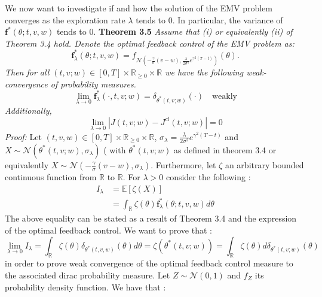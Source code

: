 \documentclass[oneside, a4paper, onecolumn, 11pt]{article}
\begin{document}
We now want to investigate if and how the solution of the EMV problem converges as the exploration rate $\lambda$ tends to 0. In particular, the variance of \(\boldsymbol{f}^*(\theta;t,v,w)\) tends to 0. 
\newline
\textbf{Theorem 3.5} \cite{WangZhou2020} \textit{Assume that (i) or equivalently (ii) of Theorem 3.4 hold. 
Denote the optimal feedback control of the EMV problem as: 
 \[
    \boldsymbol{f}_\lambda^*(\theta;t,v,w) = f_{\mathcal{N}\left( - \frac{\gamma}{\sigma}(v-w), \frac{\lambda}{2\sigma^2} e^{\gamma^2(T-t)} \right)}(\theta).
    \]
Then for all $(t,v;w) \in [0,T] \times \mathbb{R}_{\geq 0} \times \mathbb{R}$ we have the following weak-convergence of probability measures. 
\begin{equation*}
    \lim_{\lambda\to 0} \boldsymbol{f}_\lambda^*(\cdot, t,v;w) = \delta_{\theta^*(t,v;w)}(\cdot)  \quad \text{weakly}
\end{equation*}
Additionally, 
\begin{equation*}
    \lim_{\lambda\to 0}\left| J(t,v;w) - J^{cl}(t,v;w)\right| = 0
\end{equation*} 
}
\textit{Proof:}
Let $(t,v,w) \in [0,T] \times \mathbb{R}_{\geq 0} \times \mathbb{R}$, $\sigma_\lambda = \frac{\lambda}{2\sigma^2} e^{\gamma^2(T-t)}$ and $X \sim \mathcal{N}(\theta^*(t,v;w), \sigma_\lambda)$ ( with $\theta^*(t,v;w)$ as defined in theorem 3.4 or equivalently $X\sim \mathcal{N}(-\frac{\gamma}{\sigma}(v-w), \sigma_\lambda)$. 
Furthermore, let $\zeta$ an arbitrary  bounded continuous function from $\mathbb{R}$ to $\mathbb{R}$. For $\lambda >0$ consider the following : 
\begin{align*}
    I_\lambda&= \mathbb{E}\left[\zeta(X)\right]\\
             &= \int_{\mathbb{R}} \zeta(\theta)\boldsymbol{f}_\lambda^*(\theta;t,v,w)d\theta
\end{align*}
The above equality can be stated as a result of Theorem 3.4 and the expression of the optimal feedback control. 
We want to prove that : 
\begin{equation}
    \lim_{\lambda \to 0} I_\lambda = \int_{\mathbb{R}} \zeta(\theta)\delta_{\theta^*(t,v,w)}(\theta)d\theta = \zeta(\theta^*(t,v;w)) = \int_{\mathbb{R}} \zeta(\theta) d\delta_{\theta^*(t,v;w)}(\theta)
\end{equation}
in order to prove weak convergence of the optimal feedback control measure to the associated dirac probability measure. 
Let $Z\sim \mathcal{N}(0,1)$ and $f_Z$ its probability density function. We have that : 
\end{document}
